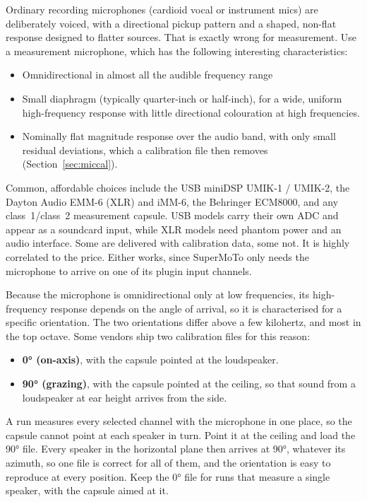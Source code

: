 Ordinary recording microphones (cardioid vocal or instrument mics) are deliberately voiced, with a directional pickup pattern and a shaped, non-flat response designed to flatter sources. That is exactly wrong for measurement. Use a measurement microphone, which has the following interesting characteristics:

\begin{itemize}[nosep]
  \item Omnidirectional in almost all the audible frequency range
  \item Small diaphragm (typically quarter-inch or half-inch), for a wide, uniform high-frequency response with little directional colouration at high frequencies.
  \item Nominally flat magnitude response over the audio band, with only small residual deviations, which a calibration file then removes (Section~\ref{sec:miccal}).
\end{itemize}

Common, affordable choices include the USB miniDSP UMIK-1 / UMIK-2, the Dayton Audio EMM-6 (XLR) and iMM-6, the Behringer ECM8000, and any class~1/class~2 measurement capsule. USB models carry their own ADC and appear as a soundcard input, while XLR models need phantom power and an audio interface. Some are delivered with calibration data, some not. It is highly correlated to the price. Either works, since SuperMoTo only needs the microphone to arrive on one of its plugin input channels.

Because the microphone is omnidirectional only at low frequencies, its high-frequency response depends on the angle of arrival, so it is characterised for a specific orientation. The two orientations differ above a few kilohertz, and most in the top octave. Some vendors ship two calibration files for this reason:

\begin{itemize}[nosep]
  \item \textbf{\ang{0} (on-axis)}, with the capsule pointed at the loudspeaker.
  \item \textbf{\ang{90} (grazing)}, with the capsule pointed at the ceiling, so that sound from a loudspeaker at ear height arrives from the side.
\end{itemize}

\noindent A run measures every selected channel with the microphone in one place, so the capsule cannot point at each speaker in turn. Point it at the ceiling and load the \ang{90} file. Every speaker in the horizontal plane then arrives at \ang{90}, whatever its azimuth, so one file is correct for all of them, and the orientation is easy to reproduce at every position. Keep the \ang{0} file for runs that measure a single speaker, with the capsule aimed at it.

